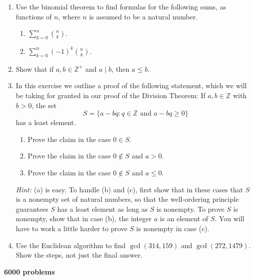 \documentclass[11pt]{article}
\def\Z{\mathbb{Z}}
\theoremstyle{plain}
\theoremstyle{remark}
\begin{document}
\begin{enumerate}
\item Use the binomial theorem to find formulas for the following sums, as functions of $n$, where $n$ is assumed to be a natural number.
\begin{enumerate}
 \item $\displaystyle\sum_{k=0}^{n} \binom{n}{k}$.
 \item $\displaystyle\sum_{k=0}^{n} (-1)^{k} \binom{n}{k}$.
\end{enumerate}


\item Show that if $a, b\in\Z^{+}$ and $a \mid b$, then $a \le b$.


\item In this exercise we outline a proof of the following statement, which we will be taking for granted in our proof of the Division Theorem: If $a, b \in \Z$ with $b > 0$, the set
\[ S= \{a-bq: q \in \Z \text{ and } a-bq\ge 0\} \]
has a least element.
\begin{enumerate}
\item Prove the claim in the case $0 \in S$.
\item Prove the claim in the case $0 \notin S$ and $a > 0$.
\item Prove the claim in the case $0\notin S$ and $a \le 0$.
\end{enumerate}
{\scriptsize \emph{Hint:} (a) is easy. To handle (b) and (c), first show that in these cases that $S$ is a nonempty set of natural numbers, so that the well-ordering principle guarantees $S$ has a least element as long as $S$ is nonempty. To prove $S$ is nonempty, show that in case (b), the integer $a$ is an element of $S$. You will have to work a little harder to prove $S$ is nonempty in case (c).}


\item Use the Euclidean algorithm to find $\gcd(314,159)$ and $\gcd(272, 1479)$. Show the steps, not just the final answer.

\end{enumerate}

\newpage
\noindent\textbf{6000 problems}
\end{document}
